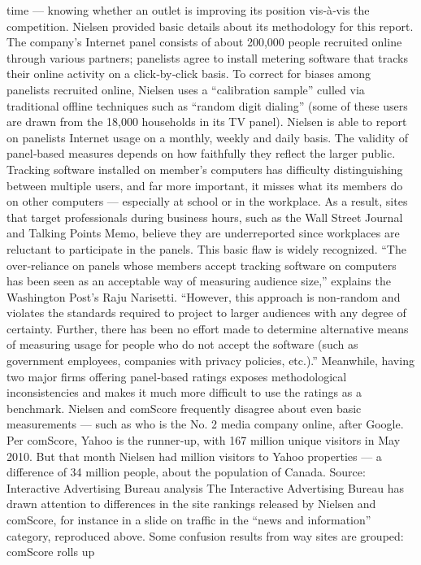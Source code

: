 time — knowing whether an outlet is improving its position vis‐à‐vis the
competition.
Nielsen provided basic details about its methodology for this report. The
company’s Internet panel consists of about 200,000 people recruited online
through various partners; panelists agree to install metering software that
tracks their online activity on a click‐by‐click basis. To correct for biases
among panelists recruited online, Nielsen uses a ``calibration sample''
culled via traditional offline techniques such as ``random digit dialing''
(some of these users are drawn from the 18,000 households in its TV
panel). Nielsen is able to report on panelists Internet usage on a monthly,
weekly and daily basis.
The validity of panel‐based measures depends on how faithfully they
reflect the larger public. Tracking software installed on member’s
computers has difficulty distinguishing between multiple users, and far
more important, it misses what its members do on other computers —
especially at school or in the workplace. As a result, sites that target
professionals during business hours, such as the Wall Street Journal and
Talking Points Memo, believe they are underreported since workplaces are
reluctant to participate in the panels.
This basic flaw is widely recognized. ``The over‐reliance on panels whose
members accept tracking software on computers has been seen as an
acceptable way of measuring audience size,'' explains the Washington
Post’s Raju Narisetti. ``However, this approach is non‐random and violates
the standards required to project to larger audiences with any degree of
certainty. Further, there has been no effort made to determine alternative
means of measuring usage for people who do not accept the software
(such as government employees, companies with privacy policies, etc.).''
Meanwhile, having two major firms offering panel‐based ratings exposes
methodological inconsistencies and makes it much more difficult to use
the ratings as a benchmark. Nielsen and comScore frequently disagree
about even basic measurements — such as who is the No. 2 media
company online, after Google. Per comScore, Yahoo is the runner‐up, with
167 million unique visitors in May 2010. But that month Nielsen had
million visitors to Yahoo properties — a difference of 34 million people,
about the population of Canada.
Source: Interactive Advertising Bureau analysis
The Interactive Advertising Bureau has drawn attention to differences in
the site rankings released by Nielsen and comScore, for instance in a slide
on traffic in the ``news and information'' category, reproduced above.
Some confusion results from way sites are grouped: comScore rolls up
